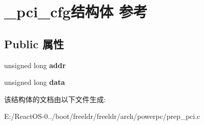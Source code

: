 \hypertarget{struct__pci__cfg}{}\section{\+\_\+pci\+\_\+cfg结构体 参考}
\label{struct__pci__cfg}
\subsection*{Public 属性}
\begin{DoxyCompactItemize}
\item 
\mbox{\label{struct__pci__cfg_a04b6c834cad6daa84af13f17dfca8593}} 
unsigned long {\bfseries addr}
\item 
\mbox{\label{struct__pci__cfg_af1307b01c50d83c99d0acc7b336b461c}} 
unsigned long {\bfseries data}
\end{DoxyCompactItemize}


该结构体的文档由以下文件生成\+:\begin{DoxyCompactItemize}
\item 
E\+:/\+React\+O\+S-\/0../boot/freeldr/freeldr/arch/powerpc/prep\+\_\+pci.\+c\end{DoxyCompactItemize}
